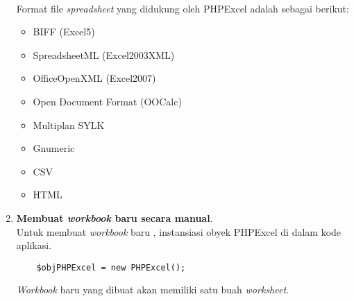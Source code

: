\begin{enumerate}
\paragraph{} Format file \textit{spreadsheet} yang didukung oleh PHPExcel adalah sebagai berikut:
\begin{itemize}
	\item BIFF (Excel5)
	\item SpreadsheetML (Excel2003XML)
	\item OfficeOpenXML (Excel2007)
	\item Open Document Format (OOCalc)
	\item Multiplan SYLK
	\item Gnumeric
	\item CSV
	\item HTML
\end{itemize}
	\item \textbf{Membuat \textit{workbook} baru secara manual}.\\
Untuk membuat \textit{workbook} baru , instansiasi obyek PHPExcel di dalam kode aplikasi.\cite{phpexcel:14} 
	\begin{lstlisting}
	$objPHPExcel = new PHPExcel();
	\end{lstlisting}
\textit{Workbook} baru yang dibuat akan memiliki satu buah \textit{worksheet}.
\end{enumerate}

